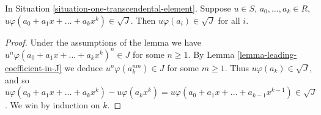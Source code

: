 \begin{lemma}
\label{lemma-all-coefficients-in-J}
In Situation \ref{situation-one-transcendental-element}.
Suppose $u \in S$, $a_0, \ldots, a_k \in R$,
$u \varphi(a_0 + a_1x + \ldots + a_k x^k) \in \sqrt{J}$.
Then $u \varphi(a_i) \in \sqrt{J}$ for all $i$.
\end{lemma}

\begin{proof}
Under the assumptions of the lemma we have
$u^n \varphi(a_0 + a_1x + \ldots + a_k x^k)^n \in J$ for
some $n \geq 1$. By Lemma \ref{lemma-leading-coefficient-in-J}
we deduce $u^n \varphi(a_k^{nm}) \in J$ for some $m \geq 1$.
Thus $u \varphi(a_k) \in \sqrt{J}$, and so
$u \varphi(a_0 + a_1x + \ldots + a_k x^k) - u \varphi(a_k x^k) =
u \varphi(a_0 + a_1x + \ldots + a_{k-1} x^{k-1}) \in \sqrt{J}$.
We win by induction on $k$.
\end{proof}
